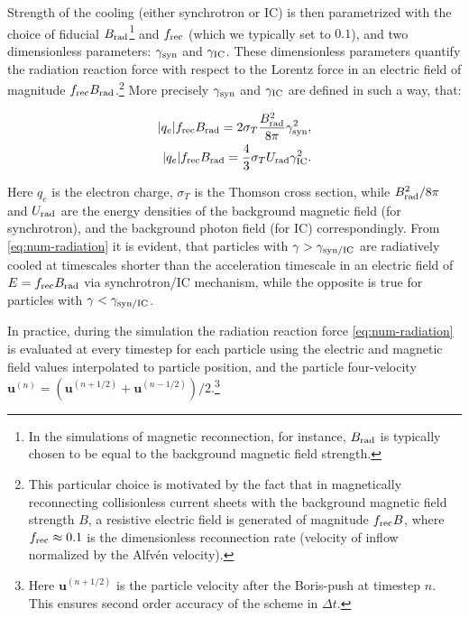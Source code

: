 \noindent Strength of the cooling (either synchrotron or IC) is then parametrized with the choice of fiducial $B_{\rm rad}$\footnote{In the simulations of magnetic reconnection, for instance, $B_{\rm rad}$ is typically chosen to be equal to the background magnetic field strength.} and $f_{\rm rec}$ (which we typically set to $0.1$), and two dimensionless parameters: $\gamma_{\rm syn}$ and $\gamma_{\rm IC}$. These dimensionless parameters quantify the radiation reaction force with respect to the Lorentz force in an electric field of magnitude $f_{\rm rec}B_{\rm rad}$.\footnote{This particular choice is motivated by the fact that in magnetically reconnecting collisionless current sheets with the background magnetic field strength $B$, a resistive electric field is generated of magnitude $f_{\rm rec} B$, where $f_{\rm rec}\approx 0.1$ is the dimensionless reconnection rate (velocity of inflow normalized by the Alfv\'en velocity).} More precisely $\gamma_{\rm syn}$ and $\gamma_{\rm IC}$ are defined in such a way, that:

\begin{equation}
    \begin{aligned}
        |q_e|f_{\rm rec}B_{\rm rad} = 2\sigma_T \frac{B_{\rm rad}^2}{8\pi} \gamma_{\rm syn}^2,\\
        |q_e|f_{\rm rec}B_{\rm rad} = \frac{4}{3}\sigma_T U_{\rm rad} \gamma_{\rm IC}^2.
    \end{aligned}
\end{equation}

\noindent Here $q_e$ is the electron charge, $\sigma_T$ is the Thomson cross section, while $B_{\rm rad}^2/8\pi$ and $U_{\rm rad}$ are the energy densities of the background magnetic field (for synchrotron), and the background photon field (for IC) correspondingly. From \eqref{eq:num-radiation} it is evident, that particles with $\gamma > \gamma_{\rm syn/IC}$ are radiatively cooled at timescales shorter than the acceleration timescale in an electric field of $E=f_{\rm rec}B_{\rm rad}$ via synchrotron/IC mechanism, while the opposite is true for particles with $\gamma < \gamma_{\rm syn/IC}$. 

In practice, during the simulation the radiation reaction force \eqref{eq:num-radiation} is evaluated at every timestep for each particle using the electric and magnetic field values interpolated to particle position, and the particle four-velocity $\bm{u}^{(n)} = (\bm{u}^{(n+1/2)} + \bm{u}^{(n-1/2)})/2$.\footnote{Here $\bm{u}^{(n+1/2)}$ is the particle velocity after the Boris-push at timestep $n$. This ensures second order accuracy of the scheme in $\Delta t$.} 

